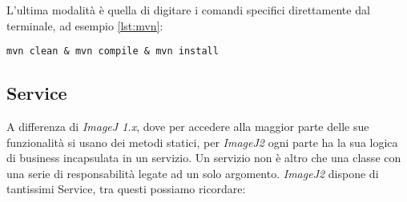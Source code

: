 \noindent L'ultima modalità è quella di digitare i comandi specifici direttamente dal terminale, ad esempio \ref{lst:mvn}:
\begin{lstlisting}[label={lst:mvn}, caption={Esempio per pulire, compilare e creare il file JAR}]
    mvn clean & mvn compile & mvn install
\end{lstlisting}

\subsection{Service}
\noindent A differenza di \textit{ImageJ 1.x}, dove per accedere alla maggior parte delle sue funzionalità si usano dei metodi statici, per \textit{ImageJ2} ogni parte ha la sua logica di business incapsulata in un servizio. Un servizio non è altro che una classe con una serie di responsabilità legate ad un solo argomento. \textit{ImageJ2} dispone di tantissimi Service, tra questi possiamo ricordare:
